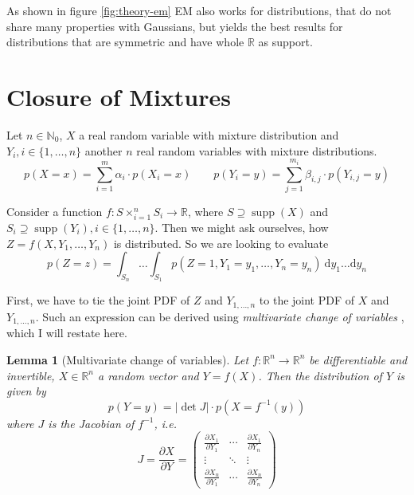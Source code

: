 \documentclass[11pt,a4paper]{book}
\newtheorem{lemma}{Lemma}
\DeclareMathOperator{\supp}{supp}
\begin{document}
As shown in figure \ref{fig:theory-em} EM also works for distributions, that do
not share many properties with Gaussians, but yields the best results for
distributions that are symmetric and have whole $\mathbb{R}$ as support.

\section{Closure of Mixtures}
\label{sec:closure}

Let $n \in \mathbb{N}_{0}$, $X$ a real random variable with mixture distribution
and $Y_{i}, i \in \{ 1, \dots, n \}$ another $n$ real random variables with
mixture distributions.
\begin{equation*}
  p(X = x) = \sum_{i = 1}^{m} \alpha_{i} \cdot p(X_{i} = x) \qquad p(Y_{i} = y) = \sum_{j = 1}^{m_{i}} \beta_{i,j} \cdot p(Y_{i,j} = y)
\end{equation*}

Consider a function $f : S \times_{i = 1}^{n} S_{i} \rightarrow \mathbb{R}$,
where $S \supseteq \supp(X)$ and
$S_{i} \supseteq \supp(Y_{i}), i \in \{ 1, \dots, n \}$. Then we might ask
ourselves, how $Z = f(X, Y_{1}, \dots, Y_{n})$ is distributed. So we are looking
to evaluate
\begin{equation*}
  p(Z = z) = \int_{S_{n}}\dots\int_{S_{1}} p(Z = 1, Y_{1} = y_{1}, \dots, Y_{n} = y_{n})~\mathrm{d}y_{1}\dots\mathrm{d}y_{n}
\end{equation*}

First, we have to tie the joint PDF of $Z$ and $Y_{1, \dots, n}$ to the joint
PDF of $X$ and $Y_{1, \dots, n}$. Such an expression can be derived using
\emph{multivariate change of variables} \cite[chapter~2.6.2.1]{murphy}, which I
will restate here.

\begin{lemma}[Multivariate change of variables]
  \label{lemma:multivariate-change}
  Let $f : \mathbb{R}^{n} \rightarrow \mathbb{R}^{n}$ be differentiable and
  invertible, $X \in \mathbb{R}^{n}$ a random vector and $Y = f(X)$. Then the
  distribution of $Y$ is given by
  \begin{equation*}
    p(Y = y) = \left| \det J \right| \cdot p(X = f^{-1}(y))
  \end{equation*}
  where $J$ is the Jacobian of $f^{-1}$, i.e.
  \begin{equation*}
    J = \frac{\partial X}{\partial Y} = \begin{pmatrix}
      \frac{\partial X_{1}}{\partial Y_{1}} & \cdots & \frac{\partial X_{1}}{\partial Y_{n}}\\
      \vdots & \ddots & \vdots\\
      \frac{\partial X_{n}}{\partial Y_{1}} & \cdots & \frac{\partial X_{n}}{\partial Y_{n}}
    \end{pmatrix}
  \end{equation*}
\end{lemma}
\end{document}

